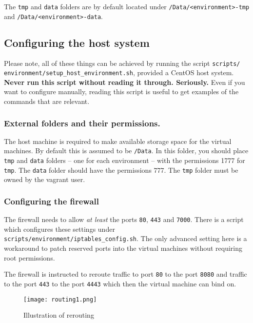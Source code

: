 The \texttt{tmp} and \texttt{data} folders are by default located under
\texttt{/Data/\textless{}environment\textgreater{}-tmp} and
\texttt{/Data/\textless{}environment\textgreater{}-data}.

\subsection{Configuring the host
system}\label{configuring-the-host-system}

Please note, all of these things can be achieved by running the script
\texttt{scripts/
environment/setup\_host\_environment.sh}, provided a
CentOS host system. \textbf{Never run this script without reading it
through. Seriously.} Even if you want to configure manually, reading
this script is useful to get examples of the commands that are relevant.

\subsubsection{External folders and their
permissions.}\label{external-folders-and-their-permissions.}

The host machine is required to make available storage space for the
virtual machines. By default this is assumed to be \texttt{/Data}. In
this folder, you should place \texttt{tmp} and \texttt{data} folders --
one for each environment -- with the permissions 1777 for \texttt{tmp}.
The \texttt{data} folder should have the permissions 777. The
\texttt{tmp} folder must be owned by the vagrant user.

\subsubsection{Configuring the firewall}\label{configuring-the-firewall}

The firewall needs to allow \emph{at least} the ports \texttt{80},
\texttt{443} and \texttt{7000}. There is a script which configures these
settings under \texttt{scripts/environment/iptables\_config.sh}. The
only advanced setting here is a workaround to patch reserved ports into
the virtual machines without requiring root permissions.

The firewall is instructed to reroute traffic to port \texttt{80} to the
port \texttt{8080} and traffic to the port \texttt{443} to the port
\texttt{4443} which then the virtual machine can bind on.

\begin{figure}[htbp]
\centering
\texttt{[image: routing1.png]}
\caption{Illustration of rerouting}
\end{figure}

